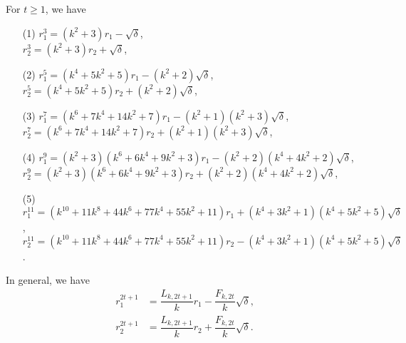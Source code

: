       \begin{lemma}
 For $t\geq 1$, we have\label{3.13}
 \begin{enumerate}
 \item[(1)] $r_1^3=(k^2+3)r_1-\sqrt{\delta}$,\\
   $r_2^3=(k^2+3)r_2+\sqrt{\delta}$,
   \item[(2)]$r_1^5=(k^4+5k^2+5)r_1-(k^2+2)\sqrt{\delta}$,\\
   $r_2^5=(k^4+5k^2+5)r_2+(k^2+2)\sqrt{\delta}$,
    \item[(3)] $r_1^7=(k^6+7k^4+14k^2+7)r_1-(k^2+1)(k^2+3)\sqrt{\delta}$,\\
   $r_2^7=(k^6+7k^4+14k^2+7)r_2+(k^2+1)(k^2+3)\sqrt{\delta}$,
    \item[(4)] $r_1^9=(k^2+3)(k^6+6k^4+9k^2+3)r_1-(k^2+2)(k^4+4k^2+2)\sqrt{\delta}$,\\
   $r_2^9=(k^2+3)(k^6+6k^4+9k^2+3)r_2+(k^2+2)(k^4+4k^2+2)\sqrt{\delta}$,
   \item[(5)] $r_1^{11}=(k^{10}+11k^8+44k^6+77k^4+55k^2+11)r_1+(k^4+3k^2+1)(k^4+5k^2+5)\sqrt{\delta}$,\\
   $r_2^{11}=(k^{10}+11k^8+44k^6+77k^4+55k^2+11)r_2-(k^4+3k^2+1)(k^4+5k^2+5)\sqrt{\delta}$.
    \end{enumerate}
    In general, we have
    \begin{align*}
    r_1^{2t+1}&=\dfrac{L_{k,2t+1}}{k}r_1-\dfrac{F_{k,2t}}{k}\sqrt{\delta},\\
    r_2^{2t+1}&=\dfrac{L_{k,2t+1}}{k}r_2+\dfrac{F_{k,2t}}{k}\sqrt{\delta}.
\end{align*}
\end{lemma}

